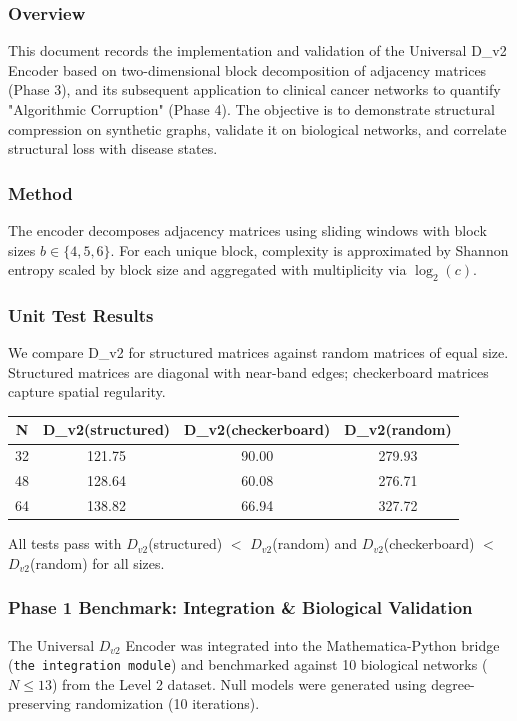 

\subsubsection{Overview}
This document records the implementation and validation of the Universal D\_v2 Encoder based on two-dimensional block decomposition of adjacency matrices (Phase 3), and its subsequent application to clinical cancer networks to quantify "Algorithmic Corruption" (Phase 4). The objective is to demonstrate structural compression on synthetic graphs, validate it on biological networks, and correlate structural loss with disease states.

\subsubsection{Method}
The encoder decomposes adjacency matrices using sliding windows with block sizes $b\in\{4,5,6\}$. For each unique block, complexity is approximated by Shannon entropy scaled by block size and aggregated with multiplicity via $\log_2(c)$.

\subsubsection{Unit Test Results}
We compare D\_v2 for structured matrices against random matrices of equal size. Structured matrices are diagonal with near-band edges; checkerboard matrices capture spatial regularity.
\begin{center}
\begin{tabular}{cccc}
\toprule
N & D\_v2(structured) & D\_v2(checkerboard) & D\_v2(random) \\
\midrule
32 & 121.75 & 90.00 & 279.93 \\
48 & 128.64 & 60.08 & 276.71 \\
64 & 138.82 & 66.94 & 327.72 \\
\bottomrule
\end{tabular}
\end{center}
All tests pass with $D_{v2}$(structured) $<$ $D_{v2}$(random) and $D_{v2}$(checkerboard) $<$ $D_{v2}$(random) for all sizes.

\subsubsection{Phase 1 Benchmark: Integration \& Biological Validation}
The Universal $D_{v2}$ Encoder was integrated into the Mathematica-Python bridge (\texttt{the integration module}) and benchmarked against 10 biological networks ($N \le 13$) from the Level 2 dataset. Null models were generated using degree-preserving randomization (10 iterations).

